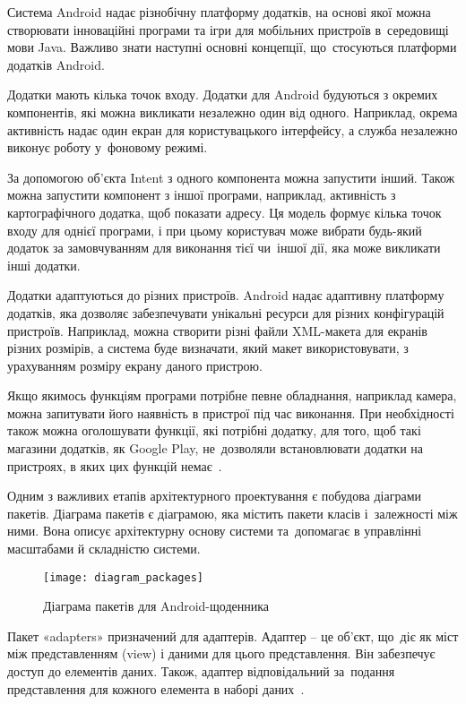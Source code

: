 \documentclass[../main.tex]{subfiles}
\begin{document}
Система Android надає різнобічну платформу додатків, на основі якої можна створювати інноваційні програми та ігри для мобільних пристроїв в~середовищі мови Java. Важливо знати наступні основні концепції, що~стосуються платформи додатків Android.

Додатки мають кілька точок входу.
Додатки для Android будуються з окремих компонентів, які можна викликати незалежно один від одного. Наприклад, окрема активність надає один екран для користувацького інтерфейсу, а служба незалежно виконує роботу у~фоновому режимі.

За допомогою об'єкта Intent з одного компонента можна запустити інший. Також можна запустити компонент з іншої програми, наприклад, активність з картографічного додатка, щоб показати адресу. Ця модель формує кілька точок входу для однієї програми, і при цьому користувач може вибрати будь-який додаток за замовчуванням для виконання тієї чи~іншої дії, яка може викликати інші додатки.

Додатки адаптуються до різних пристроїв.
Android надає адаптивну платформу додатків, яка дозволяє забезпечувати унікальні ресурси для різних конфігурацій пристроїв. Наприклад, можна створити різні файли \mbox{XML-макета} для екранів різних розмірів, а система буде визначати, який макет використовувати, з урахуванням розміру екрану даного пристрою.

Якщо якимось функціям програми потрібне певне обладнання, наприклад камера, можна запитувати його наявність в пристрої під час виконання. При необхідності також можна оголошувати функції, які потрібні додатку, для того, щоб такі магазини додатків, як Google Play, не~дозволяли встановлювати додатки на пристроях, в яких цих функцій немає~\cite{android_4}.

Одним з важливих етапів архітектурного проектування є побудова діаграми пакетів. Діаграма пакетів є діаграмою, яка містить пакети класів і~залежності між ними. Вона описує архітектурну основу системи та~допомагає в управлінні масштабами й складністю системи. 


\begin{figure}[h]
	\centering
	\texttt{[image: diagram\_packages]}
	\caption{Діаграма пакетів для Android-щоденника}
	\label{diagram:packages}
\end{figure}


Пакет «adapters» призначений для адаптерів. Адаптер -- це об'єкт, що~діє як міст між представленням (view) і даними для цього представлення. Він забезпечує доступ до елементів даних. Також, адаптер відповідальний за~подання представлення для кожного елемента в наборі даних~\cite{adapter}. 
\end{document}
